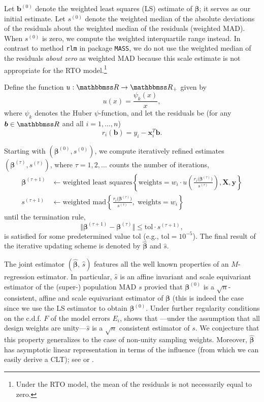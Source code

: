 \documentclass[a4paper,oneside,11pt,DIV=12]{scrartcl}
\newcommand{\R}{{\mathbbmss R}}         %
\theoremstyle{remark}
\begin{document}
Let $\bm b^{(0)}$ denote the weighted least squares (LS) estimate of $\bm \beta$; it serves as our initial estimate. Let  $s^{(0)}$ denote the weighted median of the absolute deviations of the residuals about the weighted median of the residuals (weighted MAD). When $s^{(0)}$ is zero, we compute the weighted interquartile range instead. In contrast to method \texttt{rlm} in package \texttt{MASS}, we do not use the weighted median of the residuals \textit{about zero} as weighted MAD because this scale estimate is not appropriate for the RTO model.\footnote{Under the RTO model, the mean of the residuals is not necessarily equal to zero.} 

Define the function $u:\R \rightarrow \R_+$ given by 
\begin{equation*}
   u(x) = \frac{\psi_k(x)}{x},
\end{equation*}
\noindent where $\psi_k$ denotes the Huber $\psi$-function, and let the residuals be (for any $\bm b \in \R$ and all $i=1,\ldots,n$) 
\begin{equation*}
   r_i(\bm b) = y_i - \bm x_i^T \bm b.
\end{equation*}

Starting with $(\bm \beta^{(0)}, s^{(0)})$, we compute iteratively refined estimates $(\bm \beta^{(\tau)}, s^{(\tau)})$, where $\tau=1,2,\ldots$ counts the number of iterations, 
\begin{align*}
   \bm \beta^{(\tau + 1)} &\leftarrow \text{weighted least squares}\left\{ \mathrm{weights} = w_i\cdot u\left( \frac{r_i\big(\bm \beta^{(\tau)}\big)}{s^{(\tau)}}\right), \bm X, \bm y \right\} \\ 
   s^{(\tau + 1)} &\leftarrow \text{weighted mad}\left\{ \frac{r_i\big(\bm \beta^{(\tau)}\big)}{s^{(\tau)}},\; \mathrm{weights}=w_i \right\} 
\end{align*}
\noindent until the termination rule,
\begin{equation*}
   \big\Vert \bm \beta^{(\tau + 1)} - \bm \beta^{(\tau)} \big\Vert \leq \mathrm{tol} \cdot s^{(\tau + 1)},
\end{equation*}
\noindent is satisfied for some predetermined value $\mathrm{tol}$ (e.g., $\mathrm{tol} = 10^{-5}$). The final result of the iterative updating scheme is denoted by $\widehat{\bm \beta}$ and $\widehat{s}$. 

The joint estimator $(\widehat{\bm \beta}, \, \widehat{s})$ features all the well known properties of an $M$-regression estimator. In particular, $\widehat{s}$ is an affine invariant and scale equivariant estimator of the (super-) population MAD $s$ provied that $\bm \beta^{(0)}$ is a $\sqrt{n}$-consistent, affine and scale equivariant estimator of $\bm \beta$ (this is indeed the case since we use the LS estimator to obtain $\bm \beta^{(0)}$. Under further regularity conditions on the c.d.f. $F$ of the model errors $E_i$, \citet{welsh_1986} shows that ---under the assumption that all design weights are unity---$\widehat{s}$ is a $\sqrt{n}$ consistent estimator of $s$. We conjecture that this property generalizes to the case of non-unity sampling weights. Moreover, $\widehat{\bm \beta}$ has asymptotic linear representation in terms of the influence (from which we can easily derive a CLT); see \citet{welsh_1986} or \citet[][ch. 5]{jureckova_sen_1996}.
\end{document}
